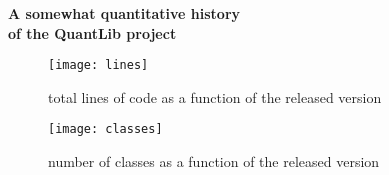 \documentclass[12pt,a4paper]{article}
\begin{document}
\begin{center}
    \textbf{\Large A somewhat quantitative history \\ of the QuantLib project}
\end{center}

\begin{figure}[htbp]
    \centering
    \texttt{[image: lines]}
    \caption{total lines of code as a function of the released version}
\end{figure}

\begin{figure}[htbp]
    \centering
    \texttt{[image: classes]}
    \caption{number of classes as a function of the released version}
\end{figure}
\end{document}
